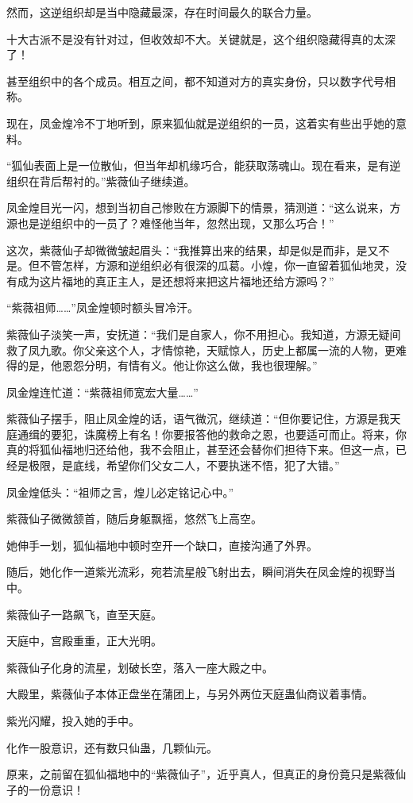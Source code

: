 \begin{this_body}
然而，这逆组织却是当中隐藏最深，存在时间最久的联合力量。

十大古派不是没有针对过，但收效却不大。关键就是，这个组织隐藏得真的太深了！

甚至组织中的各个成员。相互之间，都不知道对方的真实身份，只以数字代号相称。

现在，凤金煌冷不丁地听到，原来狐仙就是逆组织的一员，这着实有些出乎她的意料。

“狐仙表面上是一位散仙，但当年却机缘巧合，能获取荡魂山。现在看来，是有逆组织在背后帮衬的。”紫薇仙子继续道。

凤金煌目光一闪，想到当初自己惨败在方源脚下的情景，猜测道：“这么说来，方源也是逆组织中的一员了？难怪他当年，忽然出现，又那么巧合！”

这次，紫薇仙子却微微皱起眉头：“我推算出来的结果，却是似是而非，是又不是。但不管怎样，方源和逆组织必有很深的瓜葛。小煌，你一直留着狐仙地灵，没有成为这片福地的真正主人，是还想将来把这片福地还给方源吗？”

“紫薇祖师……”凤金煌顿时额头冒冷汗。

紫薇仙子淡笑一声，安抚道：“我们是自家人，你不用担心。我知道，方源无疑间救了凤九歌。你父亲这个人，才情惊艳，天赋惊人，历史上都属一流的人物，更难得的是，他恩怨分明，有情有义。他让你这么做，我也很理解。”

凤金煌连忙道：“紫薇祖师宽宏大量……”

紫薇仙子摆手，阻止凤金煌的话，语气微沉，继续道：“但你要记住，方源是我天庭通缉的要犯，诛魔榜上有名！你要报答他的救命之恩，也要适可而止。将来，你真的将狐仙福地归还给他，我不会阻止，甚至还会替你们担待下来。但这一点，已经是极限，是底线，希望你们父女二人，不要执迷不悟，犯了大错。”

凤金煌低头：“祖师之言，煌儿必定铭记心中。”

紫薇仙子微微颔首，随后身躯飘摇，悠然飞上高空。

她伸手一划，狐仙福地中顿时空开一个缺口，直接沟通了外界。

随后，她化作一道紫光流彩，宛若流星般飞射出去，瞬间消失在凤金煌的视野当中。

紫薇仙子一路飙飞，直至天庭。

天庭中，宫殿重重，正大光明。

紫薇仙子化身的流星，划破长空，落入一座大殿之中。

大殿里，紫薇仙子本体正盘坐在蒲团上，与另外两位天庭蛊仙商议着事情。

紫光闪耀，投入她的手中。

化作一股意识，还有数只仙蛊，几颗仙元。

原来，之前留在狐仙福地中的“紫薇仙子”，近乎真人，但真正的身份竟只是紫薇仙子的一份意识！


\end{this_body}
